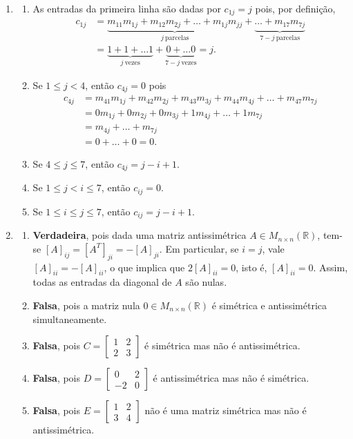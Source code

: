 \documentclass[12pt,a4paper]{article}
\newcommand*\R{\mathbb{R}}
\begin{document}
\begin{enumerate}
\item \begin{enumerate}
\item
As entradas da primeira linha são dadas por $c_{1j} = j$ pois, por definição,
\begin{align*}
c_{1j} & = \underbrace{m_{11}m_{1j} + m_{12}m_{2j} + \ldots + m_{1j}m_{jj}}_{j\ \text{parcelas}} + \underbrace{\ldots + m_{17}m_{7j}}_{7-j\ \text{parcelas}} \\
       & =\underbrace{1 + 1 + \ldots 1}_{j\ \text{vezes}} + \underbrace{0 + \ldots 0}_{7-j\ \text{vezes}} = j.
\end{align*}

\item
Se $1 \leq j < 4$, então
$c_{4j} = 0$ pois
\begin{align*}
c_{4j} & = m_{41}m_{1j} + m_{42}m_{2j} + m_{43}m_{3j} + m_{44}m_{4j} + \ldots + m_{47}m_{7j} \\
       & = 0 m_{1j} + 0 m_{2j} + 0 m_{3j} + 1 m_{4j} + \ldots + 1m_{7j} \\
       & = m_{4j} + \ldots + m_{7j} \\
       & = 0 + \ldots + 0 = 0.
\end{align*}

\item
Se $4 \leq j \leq 7$, então $c_{4j} = j - i + 1$.
\item
Se $1 \leq j < i \leq 7$, então $c_{ij} = 0$.
\item
Se $1 \leq i \leq j \leq 7$, então $c_{ij} = j - i + 1$.
\end{enumerate}

\item \begin{enumerate}
\item
\textbf{Verdadeira}, pois dada uma matriz antissimétrica $A \in M_{n \times n}(\R)$, tem-se $[A]_{ij} = [A^T]_{ji} = -[A]_{ji}$. Em particular, se $i = j$, vale $[A]_{ii} = -[A]_{ii}$, o que implica que  $2[A]_{ii} = 0$, isto é,  $[A]_{ii} = 0$. Assim, todas as entradas da diagonal de $A$ são nulas.
\item
\textbf{Falsa}, pois a matriz nula $0 \in M_{n \times n}(\R)$ é simétrica e antissimétrica simultaneamente.
\item
\textbf{Falsa}, pois $C = \begin{bmatrix}
1 & 2 \\ 2 & 3
\end{bmatrix}$ é simétrica mas não é antissimétrica.
\item
\textbf{Falsa}, pois $D = \begin{bmatrix}
0 & 2 \\ -2 & 0
\end{bmatrix}$ é antissimétrica mas não é simétrica.
\item
\textbf{Falsa}, pois $E = \begin{bmatrix}
1 & 2 \\ 3 & 4
\end{bmatrix}$ não é uma matriz simétrica mas não é antissimétrica.
\end{enumerate}


\end{enumerate}
\end{document}
